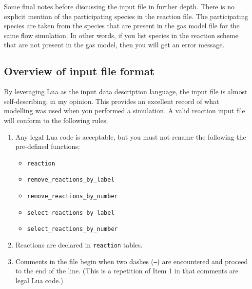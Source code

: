 Some final notes before discussing the input file in further depth.
There is no explicit mention of the participating species in the reaction file.
The participating species are taken from the species that are present in
the gas model file for the same flow simulation.
In other words, if you list species in the reaction scheme that are not
present in the gas model, then you will get an error message.

\subsection{Overview of input file format}
By leveraging Lua as the input data description language,
the input file is almost self-describing, in my opinion.
This provides an excellent record of what modelling was used when
you performed a simulation.
A valid reaction input file will conform to the following rules.
\begin{enumerate}
 \item Any legal Lua code is acceptable, but you must not
       rename the following the pre-defined functions:
       \begin{itemize}
        \item \texttt{reaction}
        \item \texttt{remove\_reactions\_by\_label}
        \item \texttt{remove\_reactions\_by\_number}
        \item \texttt{select\_reactions\_by\_label}
        \item \texttt{select\_reactions\_by\_number}
       \end{itemize}
 \item Reactions are declared in \texttt{reaction} tables.
 \item Comments in the file begin when two dashes (\texttt{--}) are encountered
       and proceed to the end of the line. (This is a repetition of Item 1 in that
       comments are legal Lua code.)
\end{enumerate}

